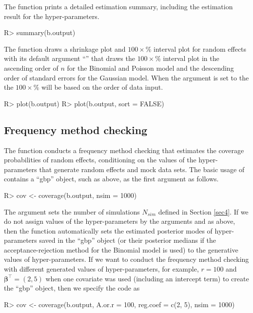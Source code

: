 \documentclass[article]{jss}
\begin{document}
The function  prints a detailed estimation summary, including the estimation result for the hyper-parameters.
\begin{CodeChunk}
\begin{CodeInput}
R> summary(b.output)
\end{CodeInput}
\end{CodeChunk}

The function  draws a shrinkage plot and $100\times$\% interval plot for random effects with its default argument ``'' that draws the $100\times$\% interval plot in the ascending order of $n$ for the Binomial and Poisson model and the descending order of standard errors for the Gaussian model. When the argument  is set to  the the $100\times$\% will be based on the order of data input.
\begin{CodeChunk}
\begin{CodeInput}
R> plot(b.output)
R> plot(b.output, sort = FALSE)
\end{CodeInput}
\end{CodeChunk}

\subsection{Frequency method checking}
The function  conducts a frequency method checking that estimates the coverage probabilities of  random effects, conditioning on the values of the hyper-parameters that generate random effects and  mock data sets. The basic usage of  contains a ``gbp'' object, such as  above, as the first argument as follows.
\begin{CodeChunk}
\begin{CodeInput}
R> cov <- coverage(b.output, nsim = 1000)
\end{CodeInput}
\end{CodeChunk}

The argument  sets the number of simulations $N_{sim}$ defined in Section \ref{sec4}. If we do not assign values of the hyper-parameters by the arguments  and  as above, then the function  automatically sets the estimated posterior modes of hyper-parameters saved in the ``gbp'' object (or their posterior medians if the acceptance-rejection method for the Binomial model is used) to the generative values of hyper-parameters. If we want to conduct the frequency method checking with different generated values of hyper-parameters, for example, $r=100$ and $\boldsymbol{\beta}^\top=(2, 5)$ when one covariate was used (including an intercept term) to create the ``gbp'' object, then we specify the code as
\begin{CodeChunk}
\begin{CodeInput}
R> cov <- coverage(b.output, A.or.r = 100, reg.coef = c(2, 5), nsim = 1000)
\end{CodeInput}
\end{CodeChunk}
\end{document}
